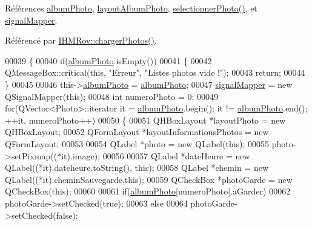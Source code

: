 Références \hyperlink{ihmalbumphoto_8h_source_l00044}{album\+Photo}, \hyperlink{ihmalbumphoto_8h_source_l00041}{layout\+Album\+Photo}, \hyperlink{ihmalbumphoto_8cpp_source_l00081}{selectionner\+Photo()}, et \hyperlink{ihmalbumphoto_8h_source_l00043}{signal\+Mapper}.



Référencé par \hyperlink{ihmrov_8cpp_source_l00223}{I\+H\+M\+Rov\+::charger\+Photos()}.


\begin{DoxyCode}
00039 \{
00040     \textcolor{keywordflow}{if}(\hyperlink{class_i_h_m_album_photo_a686adeccd626a94d9a4996782c851c61}{albumPhoto}.isEmpty())
00041     \{
00042         QMessageBox::critical(\textcolor{keyword}{this}, \textcolor{stringliteral}{"Erreur"}, \textcolor{stringliteral}{"Listes photos vide !"});
00043         \textcolor{keywordflow}{return};
00044     \}
00045 
00046     this->\hyperlink{class_i_h_m_album_photo_a686adeccd626a94d9a4996782c851c61}{albumPhoto} = \hyperlink{class_i_h_m_album_photo_a686adeccd626a94d9a4996782c851c61}{albumPhoto};
00047     \hyperlink{class_i_h_m_album_photo_a184d7d26edab19328980b55ce727811b}{signalMapper} = \textcolor{keyword}{new} QSignalMapper(\textcolor{keyword}{this});
00048     \textcolor{keywordtype}{int} numeroPhoto = 0;
00049     \textcolor{keywordflow}{for}(QVector<Photo>::iterator it = \hyperlink{class_i_h_m_album_photo_a686adeccd626a94d9a4996782c851c61}{albumPhoto}.begin(); it != 
      \hyperlink{class_i_h_m_album_photo_a686adeccd626a94d9a4996782c851c61}{albumPhoto}.end(); ++it, numeroPhoto++)
00050     \{
00051         QHBoxLayout *layoutPhoto = \textcolor{keyword}{new} QHBoxLayout;
00052         QFormLayout *layoutInformationsPhotos = \textcolor{keyword}{new} QFormLayout;
00053 
00054         QLabel *photo = \textcolor{keyword}{new} QLabel(\textcolor{keyword}{this});
00055         photo->setPixmap((*it).image);
00056 
00057         QLabel *dateHeure = \textcolor{keyword}{new} QLabel((*it).dateheure.toString(), \textcolor{keyword}{this});
00058         QLabel *chemin = \textcolor{keyword}{new} QLabel((*it).cheminSauvegarde,\textcolor{keyword}{this});
00059         QCheckBox *photoGarde = \textcolor{keyword}{new} QCheckBox(\textcolor{keyword}{this});
00060 
00061         \textcolor{keywordflow}{if}(\hyperlink{class_i_h_m_album_photo_a686adeccd626a94d9a4996782c851c61}{albumPhoto}[numeroPhoto].aGarder)
00062             photoGarde->setChecked(\textcolor{keyword}{true});
00063         \textcolor{keywordflow}{else}
00064             photoGarde->setChecked(\textcolor{keyword}{false});

\end{DoxyCode}
